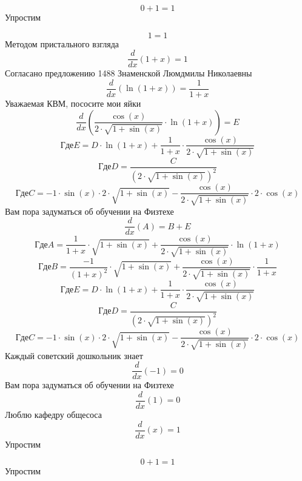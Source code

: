 \documentclass[12pt, a4paper]{article}
\begin{document}
\begin{equation}
0+1 = 1
\end{equation}
Упростим

\begin{equation}
1 = 1
\end{equation}
Методом пристального взгляда
\begin{equation}
\frac{d}{dx}(1+x) = 1
\end{equation}
Согласано предложению 1488 Знаменской Люмдмилы Николаевны
\begin{equation}
\frac{d}{dx}(\ln(1+x)) = \frac{1}{1+x}
\end{equation}
Уважаемая КВМ, пососите мои яйки
\begin{equation}
\frac{d}{dx}(\frac{\cos(x)}{2 \cdot \sqrt{1+\sin(x)}} \cdot \ln(1+x)) = E
\end{equation}
$$Где E = D \cdot \ln(1+x)+\frac{1}{1+x} \cdot \frac{\cos(x)}{2 \cdot \sqrt{1+\sin(x)}}$$
$$Где D = \frac{C}{{(2 \cdot \sqrt{1+\sin(x)})}^{2}}$$
$$Где C = -1 \cdot \sin(x) \cdot 2 \cdot \sqrt{1+\sin(x)}-\frac{\cos(x)}{2 \cdot \sqrt{1+\sin(x)}} \cdot 2 \cdot \cos(x)$$
Вам пора задуматься об обучении на Физтехе
\begin{equation}
\frac{d}{dx}(A) = B+E
\end{equation}
$$Где A = \frac{1}{1+x} \cdot \sqrt{1+\sin(x)}+\frac{\cos(x)}{2 \cdot \sqrt{1+\sin(x)}} \cdot \ln(1+x)$$
$$Где B = \frac{-1}{{(1+x)}^{2}} \cdot \sqrt{1+\sin(x)}+\frac{\cos(x)}{2 \cdot \sqrt{1+\sin(x)}} \cdot \frac{1}{1+x}$$
$$Где E = D \cdot \ln(1+x)+\frac{1}{1+x} \cdot \frac{\cos(x)}{2 \cdot \sqrt{1+\sin(x)}}$$
$$Где D = \frac{C}{{(2 \cdot \sqrt{1+\sin(x)})}^{2}}$$
$$Где C = -1 \cdot \sin(x) \cdot 2 \cdot \sqrt{1+\sin(x)}-\frac{\cos(x)}{2 \cdot \sqrt{1+\sin(x)}} \cdot 2 \cdot \cos(x)$$
Каждый советский дошкольник знает
\begin{equation}
\frac{d}{dx}(-1) = 0
\end{equation}
Вам пора задуматься об обучении на Физтехе
\begin{equation}
\frac{d}{dx}(1) = 0
\end{equation}
Люблю кафедру общесоса
\begin{equation}
\frac{d}{dx}(x) = 1
\end{equation}
Упростим

\begin{equation}
0+1 = 1
\end{equation}
Упростим
\end{document}
